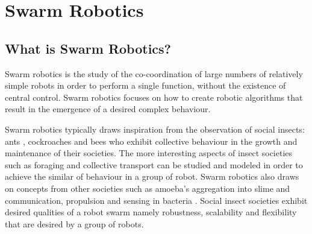 
\chapter{Swarm Robotics}
\label{chap:first}





\section{What is Swarm Robotics?}
\label{sec:first:definitionswarmrobotics}

Swarm robotics is the study of the co-coordination of large numbers of relatively simple robots in order to perform a single function, without the existence of central control. Swarm robotics focuses on how to create robotic algorithms that result in the emergence of a desired complex behaviour\cite{csahin2005swarm}.

Swarm robotics typically draws inspiration from the observation of social insects: ants \cite{hoff2010two}, cockroaches \cite{garnier2005aggregation} and bees \cite{lee2012foraging} who exhibit collective behaviour in the growth and maintenance of their societies\cite{wilson1971insect, bailishive}. The more interesting aspects of insect societies such as foraging and collective transport can be studied and modeled in order to achieve the similar of behaviour in a group of robot. Swarm robotics also draws on concepts from other societies such as amoeba's aggregation into slime \cite{schmickl2007navigation} and communication, propulsion and sensing in bacteria \cite{dhariwal2004bacterium,martel2010using}. Social insect societies exhibit desired qualities of a robot swarm namely robustness, scalability and flexibility that are desired by a group of robots.

